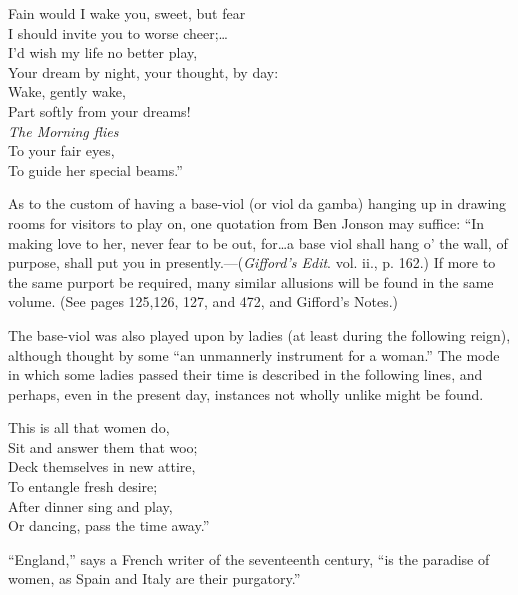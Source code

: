 \settowidth{\versewidth}{Fain would I wake you, sweet, but fear}
\begin{scverse}
\begin{patverse}
Fain would I wake you, sweet, but fear\\
I should invite you to worse cheer;\ldots \\
I’d wish my life no better play,\\
Your dream by night, your thought, by day:\\
Wake, gently wake,\\
Part softly from your dreams!\\
\textit{The Morning flies}\\
To your fair eyes,\\
To guide her special beams.”
\end{patverse}
\end{scverse}


As to the custom of having a base-viol (or viol da gamba) hanging up in drawing
rooms for visitors to play on, one quotation from Ben Jonson may suffice:
“In making love to her, never fear to be out, for\ldots  a base viol shall hang o’ the
wall, of purpose, shall put you in \pagebreak presently.—(\textit{Gifford’s Edit}. vol. ii., p. 162.)
If more to the same purport be required, many similar allusions will be found in
the same volume. (See pages 125,126, 127, and 472, and Gifford’s Notes.)

The base-viol was also played upon by ladies (at least during the following
reign), although thought by some “an unmannerly instrument for a woman.”
The mode in which some ladies passed their time is described in the following
lines, and perhaps, even in the present day, instances not wholly unlike might be
found.

\settowidth{\versewidth}{Sit and answer them that woo;}
\begin{scverse}This is all that women do,\\
Sit and answer them that woo;\\
Deck themselves in new attire,\\
To entangle fresh desire;\\
After dinner sing and play,\\
Or dancing, pass the time away.”
\end{scverse}

“England,” says a French writer of the seventeenth century, “is the paradise of
women, as Spain and Italy are their purgatory.”

